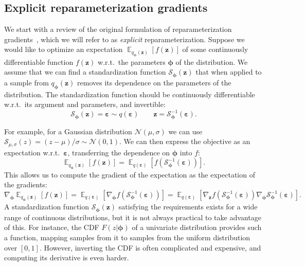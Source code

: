 \documentclass{article}
\DeclareMathOperator{\E}{\mathbb{E}}
\let\vec\bm
\newcommand{\wrt}{w.r.t.~}
\newcommand{\Sz}{\mathcal{S}_{\vec{\phi}}(\vec{z})}
\newcommand{\invS}{\mathcal{S}^{-1}_{\vec{\phi}}(\vec{\varepsilon})}
\newcommand{\SNormal}{\mathcal{S}_{\mu, \sigma}(z)}
\begin{document}
\subsection{Explicit reparameterization gradients}
\label{sec:reparam}
We start with a review of the original formulation of reparameterization gradients~\cite{titsias2014doubly,kingma2014auto,rezende2014stochastic}, which we will refer to as  \emph{explicit} reparameterization.
Suppose we would like to optimize an expectation $\E_{q_{\vec{\phi}} (\vec{z})}\left[f(\vec{z})\right]$ of some continuously differentiable function $f(\vec{z})$ \wrt the parameters $\vec{\phi}$ of the distribution.
We assume that we can find a standardization function $\Sz$ that when applied to a sample from $q_{\vec{\phi}} (\vec{z})$ removes its dependence on the parameters of the distribution. The standardization function should be continuously differentiable \wrt its argument and parameters, and invertible:
\begin{equation}
    \Sz = \vec{\varepsilon} \sim q(\vec{\varepsilon}) \qquad \vec{z} = \invS. \label{eqn:z-g-inverse}
\end{equation}

For example, for a Gaussian distribution $\mathcal{N}(\mu, \sigma)$ we can use $\SNormal = (z - \mu)/\sigma \sim \mathcal{N}(0, 1)$.
We can then express the objective as an expectation \wrt $\vec{\varepsilon}$, transferring the dependence on $\vec{\phi}$ into $f$:
\begin{equation}
\E_{q_{\vec{\phi}} (\vec{z})} \left[f(\vec{z})\right] = \E_{q(\vec{\varepsilon})} \left[ f(\invS) \right].
\end{equation}
This allows us to compute the gradient of the expectation as the expectation of the gradients:
\begin{equation}
    \nabla_{\vec{\phi}} \E_{q_{\vec{\phi}} (\vec{z})} \left[f(\vec{z})\right] = \E_{q(\vec{\varepsilon})} \left[\nabla_{\vec{\phi}} f(\invS) \right] = \E_{q(\vec{\varepsilon})} \left[ \nabla_{\vec{z}} f(\invS) \nabla_{\vec{\phi}} \invS \right].
    \label{eqn:explicit-reparameterization}
\end{equation}
A standardization function $\Sz$ satisfying the requirements exists for a wide range of continuous distributions, but it is not always practical to take advantage of this.
For instance, the CDF $F(z | \vec{\phi})$ of a univariate distribution provides such a function, mapping samples from it to samples from the uniform distribution over $[0, 1]$.
However, inverting the CDF is often complicated and expensive, and computing its derivative is even harder.
\end{document}
